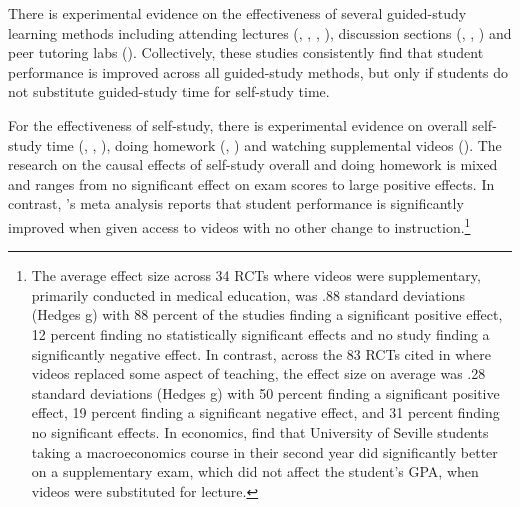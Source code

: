 \documentclass[12pt]{article}
\begin{document}
There is experimental evidence on the effectiveness of several guided-study learning methods including attending lectures (\textcite{km2003}, \textcite{dgm2010}, \textcite{jcjao2015}, \textcite{tlad2020}), discussion sections (\textcite{ans2012}, \textcite{bs2013}, \textcite{kow2020}) and peer tutoring labs (\textcite{mgm2010}).
Collectively, these studies consistently find that student performance is improved across all guided-study methods, but only if students do not substitute guided-study time for self-study time.

For the effectiveness of self-study, there is experimental evidence on overall self-study time (\textcite{ss2008}, \textcite{oppp2019}, \textcite{cgpr2020}), doing homework (\textcite{ts2012}, \textcite{gr2013}) and watching supplemental videos (\textcite{noetel2021}).
The research on the causal effects of self-study overall and doing homework is mixed and ranges from no significant effect on exam scores to large positive effects.
In contrast, \textcite{noetel2021}'s meta analysis reports that student performance is significantly improved when given access to videos with no other change to instruction.\footnote{The average effect size across 34 RCTs where videos were supplementary, primarily conducted in medical education, was .88 standard deviations (Hedges g) with 88 percent of the studies finding a significant positive effect, 12 percent finding no statistically significant effects and no study finding a significantly negative effect.  In contrast, across the 83 RCTs cited in \textcite{noetel2021} where videos replaced some aspect of teaching, the effect size on average was .28 standard deviations (Hedges g) with 50 percent finding a significant positive effect, 19 percent finding a significant negative effect, and 31 percent finding no significant effects.  In economics, \textcite{exposito2020} find that University of Seville students taking a macroeconomics course in their second year did significantly better on a supplementary exam, which did not affect the student's GPA, when videos were substituted for lecture.}

\end{document}
